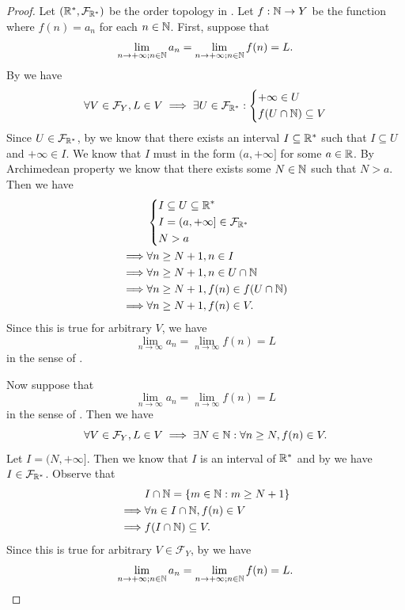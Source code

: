 \begin{proof}
  Let \((\mathbb{R}^*, \mathcal{F}_{\mathbb{R}^*})\) be the order topology in .
  Let \(f : \mathbb{N} \to Y\) be the function where \(f(n) = a_n\) for each \(n \in \mathbb{N}\).
  First, suppose that
  \[
    \lim_{n \to +\infty ; n \in \mathbb{N}} a_n = \lim_{n \to +\infty ; n \in \mathbb{N}} f(n) = L.
  \]
  By  we have
  \[
    \forall V \in \mathcal{F}_Y, L \in V \implies \exists U \in \mathcal{F}_{\mathbb{R}^*} : \begin{dcases}
      +\infty \in U \\
      f(U \cap \mathbb{N}) \subseteq V
    \end{dcases}
  \]
  Since \(U \in \mathcal{F}_{\mathbb{R}^*}\), by  we know that there exists an interval \(I \subseteq \mathbb{R}^*\) such that \(I \subseteq U\) and \(+\infty \in I\).
  We know that \(I\) must in the form \((a, +\infty]\) for some \(a \in \mathbb{R}\).
  By Archimedean property we know that there exists some \(N \in \mathbb{N}\) such that \(N > a\).
  Then we have
  \begin{align*}
             & \begin{dcases}
                 I \subseteq U \subseteq \mathbb{R}^*            \\
                 I = (a, +\infty] \in \mathcal{F}_{\mathbb{R}^*} \\
                 N > a
               \end{dcases}     \\
    \implies & \forall n \geq N + 1, n \in I               \\
    \implies & \forall n \geq N + 1, n \in U \cap \mathbb{N}       \\
    \implies & \forall n \geq N + 1, f(n) \in f(U \cap \mathbb{N}) \\
    \implies & \forall n \geq N + 1, f(n) \in V.
  \end{align*}
  Since this is true for arbitrary \(V\), we have
  \[
    \lim_{n \to \infty} a_n = \lim_{n \to \infty} f(n) = L
  \]
  in the sense of .

  Now suppose that
  \[
    \lim_{n \to \infty} a_n = \lim_{n \to \infty} f(n) = L
  \]
  in the sense of .
  Then we have
  \[
    \forall V \in \mathcal{F}_Y, L \in V \implies \exists N \in \mathbb{N} : \forall n \geq N, f(n) \in V.
  \]
  Let \(I = (N, +\infty]\).
  Then we know that \(I\) is an interval of \(\mathbb{R}^*\) and by  we have \(I \in \mathcal{F}_{\mathbb{R}^*}\).
  Observe that
  \begin{align*}
             & I \cap \mathbb{N} = \left\lbrace m \in \mathbb{N} : m \geq N + 1\right\rbrace \\
    \implies & \forall n \in I \cap \mathbb{N}, f(n) \in V       \\
    \implies & f(I \cap \mathbb{N}) \subseteq V.
  \end{align*}
  Since this is true for arbitrary \(V \in \mathcal{F}_Y\), by  we have
  \[
    \lim_{n \to +\infty ; n \in \mathbb{N}} a_n = \lim_{n \to +\infty ; n \in \mathbb{N}} f(n) = L.
  \]
\end{proof}

